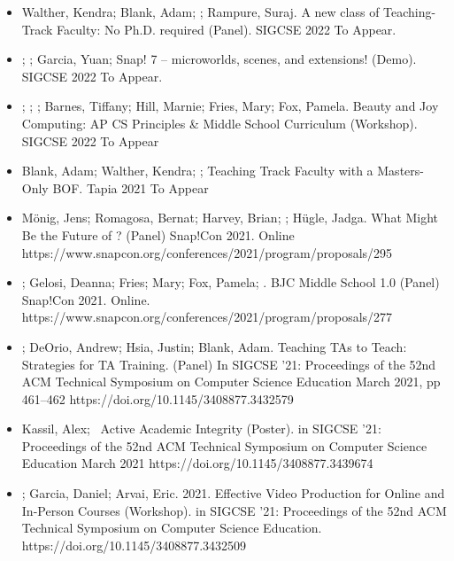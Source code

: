 \begin{itemize}

  \setlength\itemsep{1em}
    \item{Walther, Kendra; Blank, Adam; \me; Rampure, Suraj.	A new class of Teaching-Track Faculty: No Ph.D. required (Panel). SIGCSE 2022 To Appear.}
    
    \item{\dan; \me; Garcia, Yuan; Snap! 7 – microworlds, scenes, and extensions! (Demo). SIGCSE 2022 To Appear.}
    
    \item{\me; \lauren; \dan; Barnes, Tiffany; Hill, Marnie; Fries, Mary; Fox, Pamela. Beauty and Joy Computing: AP CS Principles \& Middle School Curriculum (Workshop). SIGCSE 2022 To Appear}
    
    \item{Blank, Adam; Walther, Kendra; \me; Teaching Track Faculty with a Masters-Only BOF.
    Tapia 2021 To Appear
    }
    
    \item{Mönig, Jens; Romagosa, Bernat; Harvey, Brian; \me; Hügle, Jadga. What Might Be the Future of \snap? (Panel) Snap!Con 2021. Online
    \newline
    https://www.snapcon.org/conferences/2021/program/proposals/295}
    
    \item{\dan; Gelosi, Deanna; Fries; Mary; Fox, Pamela; \me. BJC Middle School 1.0 (Panel)
    Snap!Con 2021. Online.
    \newline
    https://www.snapcon.org/conferences/2021/program/proposals/277}

    \item{\me; DeOrio, Andrew; Hsia, Justin; Blank, Adam. Teaching TAs to Teach: Strategies for TA Training. (Panel) In SIGCSE '21: Proceedings of the 52nd ACM Technical Symposium on Computer Science Education March 2021, pp 461–462
    \newline
    https://doi.org/10.1145/3408877.3432579
    }

    \item{Kassil, Alex; \me\ Active Academic Integrity (Poster).
    in SIGCSE '21: Proceedings of the 52nd ACM Technical Symposium on Computer Science Education March 2021 https://doi.org/10.1145/3408877.3439674
    }

    \item \me; Garcia, Daniel; Arvai, Eric. 2021. Effective Video Production for Online and In-Person Courses (Workshop). in SIGCSE '21: Proceedings of the 52nd ACM Technical Symposium on Computer Science Education.
    \newline
    https://doi.org/10.1145/3408877.3432509
    

\end{itemize}
